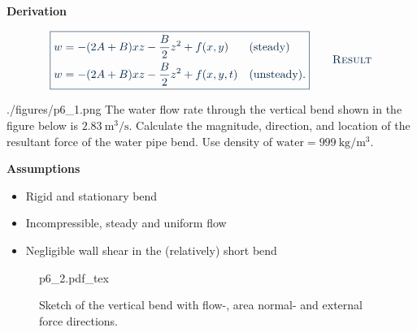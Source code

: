 \documentclass[a4paper]{article}
\newcommand{\incfig}[2][1]{%
  \def\svgwidth{#1\columnwidth}
  {#2.pdf_tex}
}
\newcounter{problem}
\numberwithin{equation}{problem}
\newcommand{\AUheading}[1]{%
  \par\vspace{.4\baselineskip}%
  {\sffamily\bfseries\color{AUblueDark}#1\par}%
  \nobreak%
}
\newenvironment{assumptions}[1][Assumptions]{%
  \AUheading{#1}
  \begin{itemize}[leftmargin=*,nosep]
}{\end{itemize}\par\medskip}
\newenvironment{derivation}[1][Derivation]{%
  \AUheading{#1}
  \begingroup\allowdisplaybreaks
  \setlength{\abovedisplayskip}{6pt}%
  \setlength{\belowdisplayskip}{6pt}%
  \setlength{\abovedisplayshortskip}{4pt}%
  \setlength{\belowdisplayshortskip}{4pt}%
}{\par\endgroup\medskip}
\newcommand{\finalresult}[1]{%
  \vspace{.2\baselineskip}%
  \begin{equation}
    {\color{AUblueDark}\boxed{\displaystyle #1}}
    \tag*{\textsc{\textcolor{AUblueDark}{Result}}}
  \end{equation}
  \newpage
}
\begin{document}
\begin{derivation}
\finalresult{
\begin{aligned}
  w &= - (2A + B) xz - \frac{B}{2}z^2 + f(x,y) & &(\text{steady}) \\
  w &= - (2A + B) xz - \frac{B}{2}z^2 + f(x,y,t) & &(\text{unsteady})
.\end{aligned}}


\end{derivation}


\begin{problemwithimage}[0.35\linewidth]{./figures/p6_1.png}
The water flow rate through the vertical bend shown in the figure below is $\qty{2,83}{\cubic\meter\per\second}$.
Calculate the magnitude, direction, and location of the resultant force of the water pipe bend.
Use density of $\mathrm{water}= \qty{999}{\kilogram\per\cubic\meter}$.
\end{problemwithimage}

\begin{assumptions}
\item Rigid and stationary bend
\item Incompressible, steady and uniform flow
\item Negligible wall shear in the (relatively) short bend
\end{assumptions}

\begin{figure}[ht]
\centering
    \incfig{p6_2}
    \caption{Sketch of the vertical bend with flow-, area normal- and external force directions.}
    \label{fig:p6_2}
\end{figure}
\end{document}
